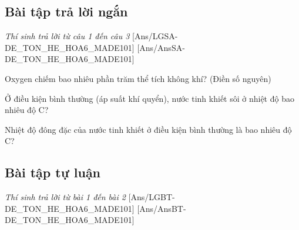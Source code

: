 \documentclass[FileMain.tex]{subfiles}
\begin{document}

\subsection{Bài tập trả lời ngắn}\textit{\large Thí sinh trả lời từ câu 1 đến câu 3}
[Ans/LGSA-DE_TON_HE_HOA6_MADE101]
[Ans/AnsSA-DE_TON_HE_HOA6_MADE101]
\setcounter{ex}{0}

\begin{ex}%
Oxygen chiếm bao nhiêu phần trăm thể tích không khí? (Điền số nguyên)
\end{ex}

\begin{ex}%
Ở điều kiện bình thường (áp suất khí quyển), nước tinh khiết sôi ở nhiệt độ bao nhiêu độ C?
\end{ex}

\begin{ex}%
Nhiệt độ đông đặc của nước tinh khiết ở điều kiện bình thường là bao nhiêu độ C?
\end{ex}


\subsection{Bài tập tự luận}\textit{\large Thí sinh trả lời từ bài 1 đến bài 2}
[Ans/LGBT-DE_TON_HE_HOA6_MADE101]
[Ans/AnsBT-DE_TON_HE_HOA6_MADE101]
\end{document}
